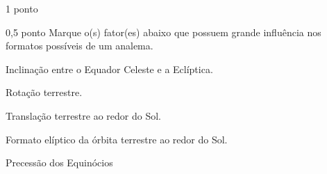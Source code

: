 \documentclass{../lista}
\begin{document}
\begin{questao}{1 ponto}
		\begin{pergunta}{0,5 ponto}
			Marque o(s) fator(es) abaixo que possuem grande influência nos formatos possíveis de um analema.
			\begin{alternativas}
				\item Inclinação entre o Equador Celeste e a Eclíptica.
				\item Rotação terrestre.
				\item Translação terrestre ao redor do Sol.
				\item Formato elíptico da órbita terrestre ao redor do Sol.
				\item Precessão dos Equinócios
			\end{alternativas}
		\end{pergunta}
	\end{questao}
	
	\encerramento
\end{document}
